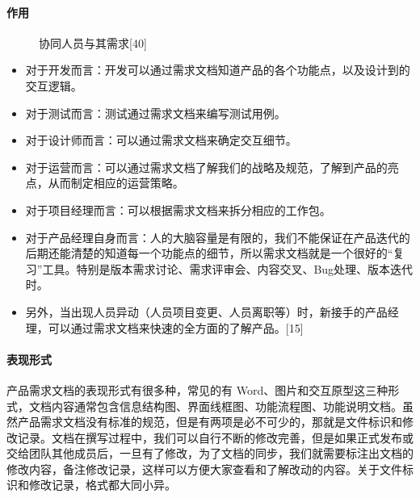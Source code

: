 \documentclass[letterpaper,11pt,english]{sphinxmanual}
\begin{document}
\paragraph{作用}
\label{\detokenize{chapter_knowledge/PRD:id9}}
\begin{figure}[H]
\centering
\capstart

\noindent{}
\caption{协同人员与其需求{[}40{]}}\label{\detokenize{chapter_knowledge/PRD:id32}}\end{figure}
\begin{itemize}
\item {} 
对于开发而言：开发可以通过需求文档知道产品的各个功能点，以及设计到的交互逻辑。

\item {} 
对于测试而言：测试通过需求文档来编写测试用例。

\item {} 
对于设计师而言：可以通过需求文档来确定交互细节。

\item {} 
对于运营而言：可以通过需求文档了解我们的战略及规范，了解到产品的亮点，从而制定相应的运营策略。

\item {} 
对于项目经理而言：可以根据需求文档来拆分相应的工作包。

\item {} 
对于产品经理自身而言：人的大脑容量是有限的，我们不能保证在产品迭代的后期还能清楚的知道每一个功能点的细节，所以需求文档就是一个很好的“复习”工具。特别是版本需求讨论、需求评审会、内容交叉、Bug处理、版本迭代时。

\item {} 
另外，当出现人员异动（人员项目变更、人员离职等）时，新接手的产品经理，可以通过需求文档来快速的全方面的了解产品。{[}15{]}

\end{itemize}


\paragraph{表现形式}
\label{\detokenize{chapter_knowledge/PRD:id10}}
产品需求文档的表现形式有很多种，常见的有
Word、图片和交互原型这三种形式，文档内容通常包含信息结构图、界面线框图、功能流程图、功能说明文档。虽然产品需求文档没有标准的规范，但是有两项是必不可少的，那就是文件标识和修改记录。文档在撰写过程中，我们可以自行不断的修改完善，但是如果正式发布或交给团队其他成员后，一旦有了修改，为了文档的同步，我们就需要标注出文档的修改内容，备注修改记录，这样可以方便大家查看和了解改动的内容。关于文件标识和修改记录，格式都大同小异。
\end{document}

